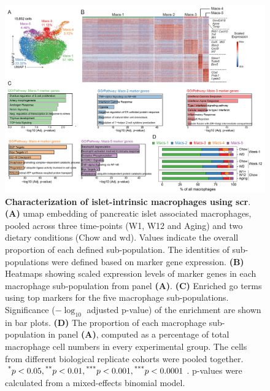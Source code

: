 \begin{figure}[t!]
\centering
\includegraphics[width=\linewidth]{Chapter4/Fig/F2-5-01.png}
\caption[Characterization of islet-intrinsic macrophages using ]{\textbf{Characterization of islet-intrinsic macrophages using \gls{scr}}. \textbf{(A)} \gls{umap} embedding of pancreatic islet associated macrophages, pooled across three time-points (W1, W12 and Aging) and two dietary conditions (Chow and \gls{wd}). Values indicate the overall proportion of each defined sub-population. The identities of sub-populations were defined based on marker gene expression. \textbf{(B)} Heatmaps showing scaled expression levels of marker genes in each macrophage sub-population from panel \textbf{(A)}. \textbf{(C)} Enriched \gls{go} terms using top markers for the five macrophage sub-populations. Significance ($-\log_{10}$ adjusted p-value) of the enrichment are shown in bar plots. \textbf{(D)} The proportion of each macrophage sub-population in panel \textbf{(A)}, computed as a percentage of total macrophage cell numbers in every experimental group. The cells from different biological replicate cohorts were pooled together. $\textsuperscript{*} p < 0.05, \textsuperscript{**} p < 0.01, \textsuperscript{***} p < 0.001, \textsuperscript{***} p < 0.0001$. p-values were calculated from a mixed-effects binomial model. }
\label{fig:chp2_scrna_macrophages}
\end{figure}


